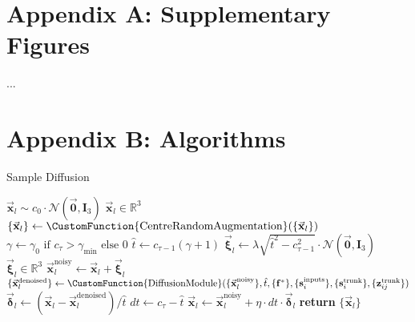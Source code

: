 \appendix

\section*{Appendix A: Supplementary Figures}
...

\section*{Appendix B: Algorithms}
\begin{algorithm}
     \caption{Sample Diffusion}
     {\small
     \begin{algorithmic}[1]
         \State $\vec{\mathbf{x}}_l \sim c_0 \cdot \mathcal{N}(\vec{\mathbf{0}}, \mathbf{I}_3)$ \hfill $\vec{\mathbf{x}}_l \in \mathbb{R}^3$
             \State $\{\vec{\mathbf{x}}_l\} \gets \CustomFunction{\text{CentreRandomAugmentation}}(\{\vec{\mathbf{x}}_l\})$
             \State $\gamma \gets \gamma_0 \text{ if } c_\tau > \gamma_{\min} \text{ else } 0$
             \State $\hat{t} \gets c_{\tau-1}(\gamma + 1)$
             \State $\vec{\boldsymbol{\xi}}_l \gets \lambda \sqrt{\hat{t}^2 - c_{\tau-1}^2} \cdot \mathcal{N}(\vec{\mathbf{0}}, \mathbf{I}_3)$ \hfill $\vec{\boldsymbol{\xi}}_l \in \mathbb{R}^3$
             \State $\vec{\mathbf{x}}_l^{\text{noisy}} \gets \vec{\mathbf{x}}_l + \vec{\boldsymbol{\xi}}_l$
             \State $\{\vec{\mathbf{x}}_l^{\text{denoised}}\} \gets \CustomFunction{\text{DiffusionModule}}(\{\vec{\mathbf{x}}_l^{\text{noisy}}\}, \hat{t}, \{\mathbf{f}^*\}, \{\mathbf{s}_i^{\text{inputs}}\}, \{\mathbf{s}_i^{\text{trunk}}\}, \{\mathbf{z}_{ij}^{\text{trunk}}\})$
             \State $\vec{\boldsymbol{\delta}}_l \gets (\vec{\mathbf{x}}_l - \vec{\mathbf{x}}_l^{\text{denoised}})/\hat{t}$
             \State $dt \gets c_\tau - \hat{t}$
             \State $\vec{\mathbf{x}}_l \gets \vec{\mathbf{x}}_l^{\text{noisy}} + \eta \cdot dt \cdot \vec{\boldsymbol{\delta}}_l$
         \EndFor
         \State \textbf{return} $\{\vec{\mathbf{x}}_l\}$
         \end{algorithmic}
     }
\end{algorithm}

